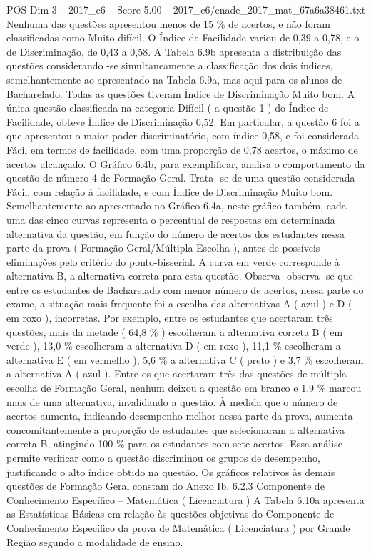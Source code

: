 \begin{textsample}{POS Dim 3 – 2017\_c6 – Score 5.00 – 2017\_c6/enade\_2017\_mat\_67a6a38461.txt}
Nenhuma das questões apresentou menos de 15 \% de acertos, e não foram classificadas como Muito difícil.
O Índice de Facilidade variou de 0,39 a 0,78, e o de Discriminação, de 0,43 a 0,58.
A Tabela 6.9b apresenta a distribuição das questões considerando -se simultaneamente a classificação dos dois índices, semelhantemente ao apresentado na Tabela 6.9a, mas aqui para os alunos de Bacharelado.
Todas as questões tiveram Índice de Discriminação Muito bom.
A única questão classificada na categoria Difícil ( a questão 1 ) do Índice de Facilidade, obteve Índice de Discriminação 0,52.
Em particular, a questão 6 foi a que apresentou o maior poder discriminatório, com índice 0,58, e foi considerada Fácil em termos de facilidade, com uma proporção de 0,78 acertos, o máximo de acertos alcançado.
O Gráfico 6.4b, para exemplificar, analisa o comportamento da questão de número 4 de Formação Geral.
Trata -se de uma questão considerada Fácil, com relação à facilidade, e com Índice de Discriminação Muito bom.
Semelhantemente ao apresentado no Gráfico 6.4a, neste gráfico também, cada uma das cinco curvas representa o percentual de respostas em determinada alternativa da questão, em função do número de acertos dos estudantes nessa parte da prova ( Formação Geral/Múltipla Escolha ), antes de possíveis eliminações pelo critério do ponto-bisserial.
A curva em verde corresponde à alternativa B, a alternativa correta para esta questão.
Observa- observa -se que entre os estudantes de Bacharelado com menor número de acertos, nessa parte do exame, a situação mais frequente foi a escolha das alternativas A ( azul ) e D ( em roxo ), incorretas.
Por exemplo, entre os estudantes que acertaram três questões, mais da metade ( 64,8 \% ) escolheram a alternativa correta B ( em verde ), 13,0 \% escolheram a alternativa D ( em roxo ), 11,1 \% escolheram a alternativa E ( em vermelho ), 5,6 \% a alternativa C ( preto ) e 3,7 \% escolheram a alternativa A ( azul ).
Entre os que acertaram três das questões de múltipla escolha de Formação Geral, nenhum deixou a questão em branco e 1,9 \% marcou mais de uma alternativa, invalidando a questão.
À medida que o número de acertos aumenta, indicando desempenho melhor nessa parte da prova, aumenta concomitantemente a proporção de estudantes que selecionaram a alternativa correta B, atingindo 100 \% para os estudantes com sete acertos.
Essa análise permite verificar como a questão discriminou os grupos de desempenho, justificando o alto índice obtido na questão.
Os gráficos relativos às demais questões de Formação Geral constam do Anexo Ib. 6.2.3 Componente de Conhecimento Específico – Matemática ( Licenciatura ) A Tabela 6.10a apresenta as Estatísticas Básicas em relação às questões objetivas do Componente de Conhecimento Específico da prova de Matemática ( Licenciatura ) por Grande Região segundo a modalidade de ensino.

\end{textsample}
